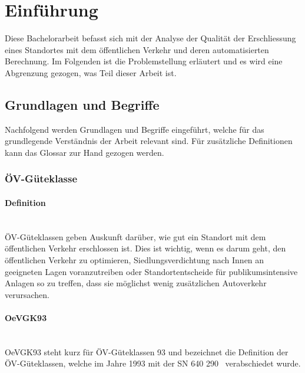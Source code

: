
\section{Einführung}
\label{Einführung}

Diese Bachelorarbeit befasst sich mit der Analyse der Qualität der Erschliessung eines Standortes mit dem öffentlichen Verkehr und deren automatisierten Berechnung.
Im Folgenden ist die Problemstellung erläutert und es wird eine Abgrenzung gezogen, was Teil dieser Arbeit ist.

\subsection{Grundlagen und Begriffe}
\label{Einführung:Grundlagen und Begriffe}

Nachfolgend werden Grundlagen und Begriffe eingeführt, welche für das grundlegende Verständnis der Arbeit relevant sind. Für zusätzliche Definitionen kann das Glossar zur Hand gezogen werden.

\subsubsection{ÖV-Güteklasse}
\label{Grundlagen und Begriffe:ÖV-Güteklasse}

\paragraph{Definition}~\\
\acs{ÖV}-Güteklassen geben Auskunft darüber, wie gut ein Standort mit dem öffentlichen Verkehr erschlossen ist.
Dies ist wichtig, wenn es darum geht, den öffentlichen Verkehr zu optimieren, Siedlungsverdichtung nach Innen an geeigneten Lagen voranzutreiben oder Standortentscheide für publikumsintensive Anlagen so zu treffen, dass sie möglichst wenig zusätzlichen Autoverkehr verursachen.~\cite{oev-guteklasse-gr-defintion}

\paragraph{OeVGK93}~\\
OeVGK93 steht kurz für \acs{ÖV}-Güteklassen 93 und bezeichnet die Definition der \acs{ÖV}-Güteklassen, welche im Jahre 1993 mit der \acs{SN} 640 290~\cite{sn640290} verabschiedet wurde.

